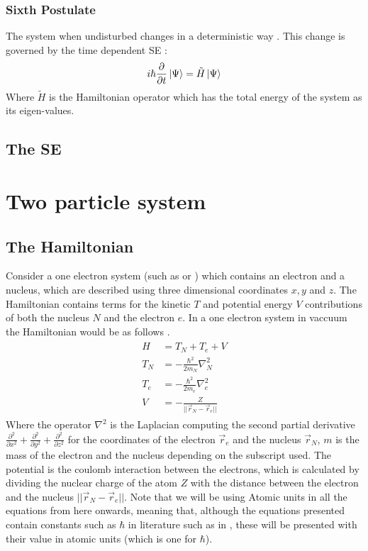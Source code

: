 \documentclass[../master_thesis.tex]{subfiles}
\begin{document}
\subsubsection{Sixth Postulate}
The system when undisturbed changes in a deterministic way \cite{Cohen:1973}.
This change is governed by the time dependent \ac{SE} \cite{Cohen:1973, Atkins:2011}:
\begin{equation}\label{eq:tdepSE}
  i\hbar\frac{\partial}{\partial t} \ket{\Psi} = \tilde{H}\ket{\Psi}
\end{equation}
Where $\tilde{H}$ is the Hamiltonian operator which has the total energy of the
system as its eigen-values.

\subsection{The \ac{SE}}



\section{Two particle system}
\subsection{The Hamiltonian}
Consider a one electron system (such as  or ) which contains an
electron and a nucleus, which are described using three dimensional coordinates
$ x, y $ and $ z $. The Hamiltonian contains terms for the kinetic $T$ and
potential energy $V$ contributions of both the nucleus $ N $ and the electron
$ e $. In a one electron system in vaccuum the Hamiltonian would be as follows
\cite{Jensen:2017, Cramer:2004}.
\begin{align}
  \begin{split}
    H   &= T_N + T_e + V \\
    T_N &= -\frac{\hbar^2}{2m_N}\nabla^2_N \\
    T_e &= -\frac{\hbar^2}{2m_e}\nabla^2_e \\
    V   &= -\frac{Z}{||\vec{r}_N - \vec{r}_e||} \label{eq:twopH}
  \end{split}
\end{align}
Where the operator $ \nabla^2$ is the Laplacian computing the second partial
derivative $ \frac{\partial^2}{\partial x^2} + \frac{\partial^2}{\partial y^2} +
\frac{\partial^2}{\partial z^2} $ for the coordinates of the electron $\vec{r}_e$
and the nucleus $\vec{r}_N$, $ m $ is the mass of the electron and the nucleus
depending on the subscript used. The potential is the coulomb interaction
between the electrons, which is calculated by dividing the nuclear charge of the
atom $ Z $ with the distance between the electron and the nucleus
$ ||\vec{r}_N - \vec{r}_e|| $. Note that we will be using Atomic units in all
the equations from here onwards, meaning that, although the equations presented
contain constants such as $\hbar$ in literature such as in \cite{Atkins:2014},
these will be presented with their value in atomic units (which is one for
$\hbar$).
\end{document}
